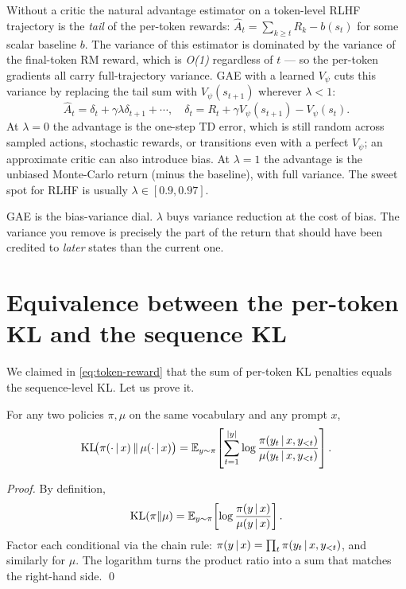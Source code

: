 \documentclass[11pt,oneside]{scrbook}
\begin{document}
Without a critic the natural advantage estimator on a token-level
RLHF trajectory is the \emph{tail} of the per-token rewards:
$\hat A_t = \sum_{k \ge t} R_k - b(s_t)$ for some scalar baseline $b$.
The variance of this estimator is dominated by the variance of the
final-token RM reward, which is \emph{O(1)} regardless of $t$ --- so
the per-token gradients all carry full-trajectory variance.
GAE with a learned $V_\psi$ cuts this variance by replacing the tail
sum with $V_\psi(s_{t+1})$ wherever $\lambda < 1$:
\begin{equation}
\hat A_t = \delta_t + \gamma\lambda \delta_{t+1} + \cdots,
\quad \delta_t = R_t + \gamma V_\psi(s_{t+1}) - V_\psi(s_t).
\label{eq:gae-expanded}
\end{equation}
At $\lambda = 0$ the advantage is the one-step TD error, which is
still random across sampled actions, stochastic rewards, or transitions even
with a perfect $V_\psi$; an approximate critic can also introduce bias. At $\lambda = 1$ the advantage is the unbiased
Monte-Carlo return (minus the baseline), with full variance. The
sweet spot for RLHF is usually $\lambda \in [0.9, 0.97]$.

\begin{intuition}
GAE is the bias-variance dial. $\lambda$ buys variance reduction at
the cost of bias. The variance you remove is precisely the part of
the return that should have been credited to \emph{later} states
than the current one.
\end{intuition}

\section{Equivalence between the per-token KL and the sequence KL}

We claimed in \eqref{eq:token-reward} that the sum of per-token KL
penalties equals the sequence-level KL. Let us prove it.

\begin{theorem}
\label{thm:klchain}
For any two policies $\pi, \mu$ on the same vocabulary and any
prompt $x$,
\[
\mathrm{KL}\!\big(\pi(\cdot \,\vert\, x) \,\|\, \mu(\cdot \,\vert\, x)\big)
  = \mathbb{E}_{y \sim \pi}\!\left[\sum_{t=1}^{|y|}
       \log\frac{\pi(y_t \,\vert\, x, y_{<t})}{\mu(y_t \,\vert\, x, y_{<t})}\right].
\]
\end{theorem}
\begin{proof}
By definition,
\[
\mathrm{KL}(\pi \| \mu) = \mathbb{E}_{y \sim \pi}\!\left[\log\frac{\pi(y \,\vert\, x)}{\mu(y \,\vert\, x)}\right].
\]
Factor each conditional via the chain rule:
$\pi(y \,\vert\, x) = \prod_t \pi(y_t \,\vert\, x, y_{<t})$, and similarly
for $\mu$. The logarithm turns the product ratio into a sum that
matches the right-hand side. \qed
\end{proof}
\end{document}
